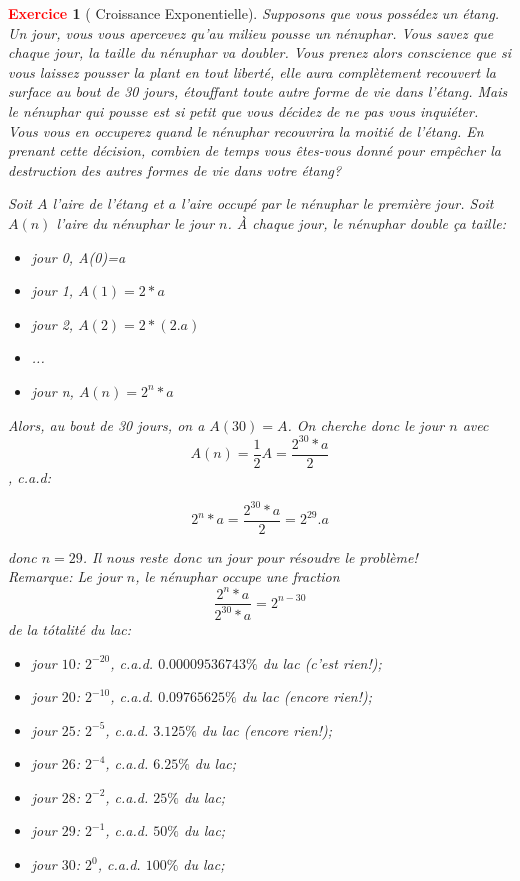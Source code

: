 \documentclass[11pt]{article}
\theoremstyle{mythmstyle}
\newtheorem{exo}{\textcolor{red}{\textbf{Exercice}}}
\begin{document}
\begin{exo}[ Croissance Exponentielle]
Supposons que vous possédez un étang. Un jour, vous vous apercevez qu'au milieu  pousse un nénuphar. Vous savez que chaque jour, la taille du nénuphar va doubler. Vous prenez alors conscience que si vous laissez pousser la plant en tout liberté, elle aura complètement recouvert la surface au bout de 30 jours, étouffant toute autre forme de vie dans l'étang. Mais le nénuphar qui pousse est si petit que vous décidez de ne pas vous inquiéter. Vous vous en occuperez quand le nénuphar recouvrira la moitié de l'étang. En prenant cette décision, combien de temps vous êtes-vous donné pour empêcher la destruction des autres formes de vie dans votre étang?  
\begin{solution}[\ref{exp00-croissance}]
 Soit $A$ l'aire de l'étang et $a$ l'aire occupé par le nénuphar le première jour. Soit $A(n)$ l'aire du nénuphar le jour $n$. À chaque jour, le nénuphar double ça taille:
 
 \begin{itemize}
     \item jour 0, A(0)=a
     \item jour 1, $A(1)=2\ast a$
     \item jour 2, $A(2)=2\ast(2.a)$
     \item ...
     \item jour n, $A(n)=2^{n}\ast a$
 \end{itemize}
 
 Alors, au bout de 30 jours, on a $A(30)= A$. On cherche donc le jour $n$ avec $$A(n)=\frac{1}{2}A= \frac{2^{30}\ast a}{2}$$, c.a.d:
 
 $$
 2^{n}\ast a= \frac{2^{30}\ast a}{2}= 2^{29}.a
 $$
 
 donc $n=29$. Il nous reste donc un jour pour résoudre le problème!\\
 
 
 Remarque: Le jour $n$, le nénuphar occupe une fraction $$\frac{2^n\ast a}{2^{30}\ast a}= 2^{n-30}$$
 de la tótalité du lac:
 
 \begin{itemize}
     \item jour $10$: $2^{-20}$, c.a.d. $0.00009536743\%$ du lac (c'est rien!);
     \item jour $20$: $2^{-10}$, c.a.d. $0.09765625\%$ du lac (encore rien!);
      \item jour $25$: $2^{-5}$, c.a.d. $3.125\%$ du lac (encore rien!);
     \item jour $26$: $2^{-4}$, c.a.d. $6.25\%$ du lac;
     \item jour $28$: $2^{-2}$, c.a.d. $25\%$ du lac;
     \item jour $29$: $2^{-1}$, c.a.d. $50\%$ du lac; 
      \item jour $30$: $2^{0}$, c.a.d. $100\%$ du lac; 
 \end{itemize}
\end{solution} 
\end{exo}
\end{document}
